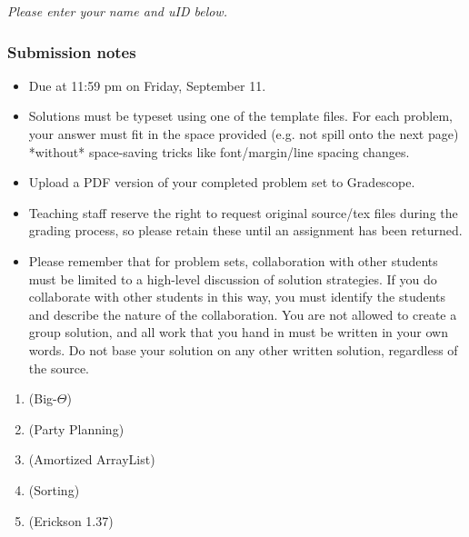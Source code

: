 \documentclass{article}
\begin{document}
{\it Please enter your name and uID below.}

\vspace{3em}

\par
{}
\par

\vfill

\subsubsection*{Submission notes}
\begin{itemize}
\item Due at 11:59 pm on Friday, September 11.
\item Solutions must be typeset using one of the template files. For each problem, your answer must fit
in the space provided (e.g. not spill onto the next page) *without* space-saving tricks
like font/margin/line spacing changes.
\item Upload a PDF version of your completed problem set to Gradescope.
\item Teaching staff reserve the right to request original source/tex files during the grading process, so please retain these until an assignment has been returned.
\item Please remember that for problem sets, collaboration with other students must be limited to a high-level discussion of solution strategies. If you do collaborate with other students in this way, you must identify the students and describe the nature of the collaboration. You are not allowed to create a group solution, and all work that you hand in must be written in your own words. Do not base your solution on any other written solution, regardless of the source.
\end{itemize}

\pagebreak


\begin{enumerate}

\item (Big-$\Theta$)


\pagebreak

\item (Party Planning)


\pagebreak

\item (Amortized ArrayList)


\pagebreak

\item (Sorting)


\pagebreak

\item (Erickson 1.37)


\end{enumerate}
\end{document}
